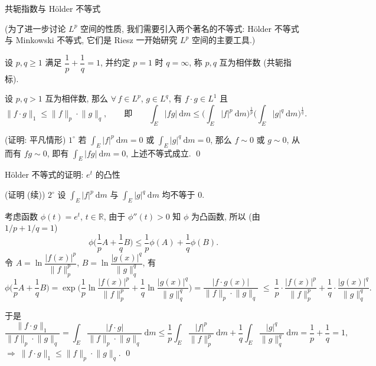 \begin{frame}{共轭指数与 Hölder 不等式}

(为了进一步讨论 $L^p$ 空间的性质, 我们需要引入两个著名的不等式:
Hölder 不等式与 Minkowski 不等式, 它们是 Riesz 一开始研究 $L^p$ 空间的主要工具.)

\begin{Def}[相伴数]
设 $p, q \geqslant 1$ 满足 $\dfrac1p + \dfrac1q = 1$, 并约定 $p = 1$ 时 $q = \infty$,
称 $p, q$ 互为\alert{相伴数} (共轭指标).
\end{Def}

\pause

\begin{thm}
设 $p, q > 1$ 互为相伴数, 那么 $\forall\, f \in L^p$, $g \in L^q$, 有 $f \cdot g \in L^1$ 且
\[
\lVert f \cdot g \rVert_1 \leqslant \lVert f \rVert_p \cdot \lVert g \rVert_q ,
\qquad\text{即}\qquad
\int_E |fg| ~ \mathrm{d} m \leqslant
\Big( \int_E |f|^p ~ \mathrm{d} m \Big)^{\frac1p}
\Big( \int_E |g|^q ~ \mathrm{d} m \Big)^{\frac1q} .
\]
\end{thm}

\pause

\startproof[bg=yellow, fg=red](证明: 平凡情形)
$1^{\circ}$ 若 $\int_E |f|^p ~ \mathrm{d} m = 0$ 或 $\int_E |g|^q ~ \mathrm{d} m = 0$,
那么 $f \sim 0$ 或 $g \sim 0$, 从而有 $fg \sim 0$, 即有 $\int_E |fg| ~ \mathrm{d} m = 0$,
上述不等式成立.
\qed

\end{frame}


\begin{frame}{Hölder 不等式的证明: $e^t$ 的凸性}

\startproof[bg=yellow, fg=red](证明 (续))
$2^{\circ}$ 设 $\int_E |f|^p ~ \mathrm{d} m$ 与 $\int_E |g|^q ~ \mathrm{d} m$ 均不等于 $0$.

考虑函数 $\phi(t) = e^t$, $t \in \mathbb{R}$, 由于 $\phi''(t) > 0$ 知 $\phi$ 为凸函数,
所以 (由 $1/p + 1/q = 1$)
\[
\phi \Big( \frac1p A + \frac1q B \Big) \leqslant \frac1p \phi(A) + \frac1q \phi(B) .
\]
令 $A = \ln \dfrac{|f(x)|^p}{\lVert f \rVert_p^p}$,
$B = \ln \dfrac{|g(x)|^q}{\lVert g \rVert_q^q}$, 有
\[
\phi \Big( \frac1p A + \frac1q B \Big)
= \exp \Big( \frac1p \ln \frac{|f(x)|^p}{\lVert f \rVert_p^p}
+ \frac1q \ln \frac{|g(x)|^q}{\lVert g \rVert_q^q} \Big)
= \frac{|f \cdot g(x)|}{\lVert f \rVert_p \cdot \lVert g \rVert_q}
\;\leqslant\;
\frac1p \cdot \frac{|f(x)|^p}{\lVert f \rVert_p^p}
+ \frac1q \cdot \frac{|g(x)|^q}{\lVert g \rVert_q^q} .
\]

\pause

于是
\[
\frac{\lVert f \cdot g \rVert_1}{\lVert f \rVert_p \cdot \lVert g \rVert_q}
= \int_E \frac{|f \cdot g|}{\lVert f \rVert_p \cdot \lVert g \rVert_q} ~ \mathrm{d} m
\leqslant \frac1p \int_E \frac{|f|^p}{\lVert f \rVert_p^p} ~ \mathrm{d} m
+ \frac1q \int_E \frac{|g|^q}{\lVert g \rVert_q^q} ~ \mathrm{d} m
= \frac1p + \frac1q = 1 ,
\]
$\Longrightarrow\ \lVert f \cdot g \rVert_1 \leqslant \lVert f \rVert_p \cdot \lVert g \rVert_q$.
\qed

\end{frame}

